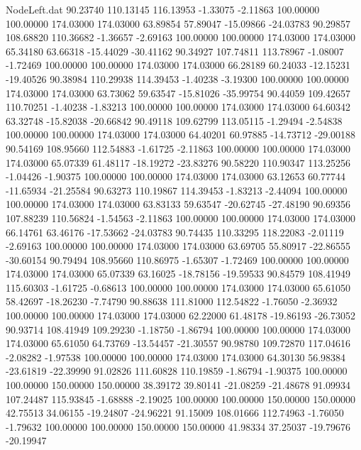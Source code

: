 \begin{filecontents}{NodeLeft.dat}
  90.23740  110.13145  116.13953    -1.33075   -2.11863  100.00000  100.00000  174.03000  174.03000   63.89854   57.89047  -15.09866  -24.03783
  90.29857  108.68820  110.36682    -1.36657   -2.69163  100.00000  100.00000  174.03000  174.03000   65.34180   63.66318  -15.44029  -30.41162
  90.34927  107.74811  113.78967    -1.08007   -1.72469  100.00000  100.00000  174.03000  174.03000   66.28189   60.24033  -12.15231  -19.40526
  90.38984  110.29938  114.39453    -1.40238   -3.19300  100.00000  100.00000  174.03000  174.03000   63.73062   59.63547  -15.81026  -35.99754
  90.44059  109.42657  110.70251    -1.40238   -1.83213  100.00000  100.00000  174.03000  174.03000   64.60342   63.32748  -15.82038  -20.66842
  90.49118  109.62799  113.05115    -1.29494   -2.54838  100.00000  100.00000  174.03000  174.03000   64.40201   60.97885  -14.73712  -29.00188
  90.54169  108.95660  112.54883    -1.61725   -2.11863  100.00000  100.00000  174.03000  174.03000   65.07339   61.48117  -18.19272  -23.83276
  90.58220  110.90347  113.25256    -1.04426   -1.90375  100.00000  100.00000  174.03000  174.03000   63.12653   60.77744  -11.65934  -21.25584
  90.63273  110.19867  114.39453    -1.83213   -2.44094  100.00000  100.00000  174.03000  174.03000   63.83133   59.63547  -20.62745  -27.48190
  90.69356  107.88239  110.56824    -1.54563   -2.11863  100.00000  100.00000  174.03000  174.03000   66.14761   63.46176  -17.53662  -24.03783
  90.74435  110.33295  118.22083    -2.01119   -2.69163  100.00000  100.00000  174.03000  174.03000   63.69705   55.80917  -22.86555  -30.60154
  90.79494  108.95660  110.86975    -1.65307   -1.72469  100.00000  100.00000  174.03000  174.03000   65.07339   63.16025  -18.78156  -19.59533
  90.84579  108.41949  115.60303    -1.61725   -0.68613  100.00000  100.00000  174.03000  174.03000   65.61050   58.42697  -18.26230   -7.74790
  90.88638  111.81000  112.54822    -1.76050   -2.36932  100.00000  100.00000  174.03000  174.03000   62.22000   61.48178  -19.86193  -26.73052
  90.93714  108.41949  109.29230    -1.18750   -1.86794  100.00000  100.00000  174.03000  174.03000   65.61050   64.73769  -13.54457  -21.30557
  90.98780  109.72870  117.04616    -2.08282   -1.97538  100.00000  100.00000  174.03000  174.03000   64.30130   56.98384  -23.61819  -22.39990
  91.02826  111.60828  110.19859    -1.86794   -1.90375  100.00000  100.00000  150.00000  150.00000   38.39172   39.80141  -21.08259  -21.48678
  91.09934  107.24487  115.93845    -1.68888   -2.19025  100.00000  100.00000  150.00000  150.00000   42.75513   34.06155  -19.24807  -24.96221
  91.15009  108.01666  112.74963    -1.76050   -1.79632  100.00000  100.00000  150.00000  150.00000   41.98334   37.25037  -19.79676  -20.19947

\end{filecontents}
